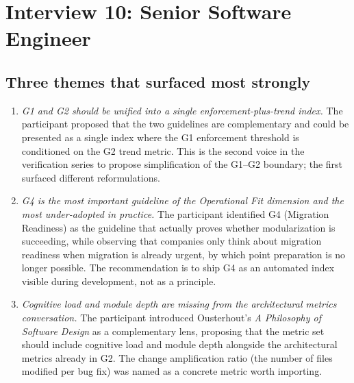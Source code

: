 
\section{Interview 10: Senior Software Engineer}
\label{sec:interview10}

\subsection*{Three themes that surfaced most strongly}

\begin{enumerate}[itemsep=8pt,topsep=2pt]
  \item \emph{G1 and G2 should be unified into a single enforcement-plus-trend index.} The participant proposed that the two guidelines are complementary and could be presented as a single index where the G1 enforcement threshold is conditioned on the G2 trend metric. This is the second voice in the verification series to propose simplification of the G1--G2 boundary; the first surfaced different reformulations.

  \item \emph{G4 is the most important guideline of the Operational Fit dimension and the most under-adopted in practice.} The participant identified G4 (Migration Readiness) as the guideline that actually proves whether modularization is succeeding, while observing that companies only think about migration readiness when migration is already urgent, by which point preparation is no longer possible. The recommendation is to ship G4 as an automated index visible during development, not as a principle.

  \item \emph{Cognitive load and module depth are missing from the architectural metrics conversation.} The participant introduced Ousterhout's \emph{A Philosophy of Software Design} as a complementary lens, proposing that the metric set should include cognitive load and module depth alongside the architectural metrics already in G2. The change amplification ratio (the number of files modified per bug fix) was named as a concrete metric worth importing.
\end{enumerate}

